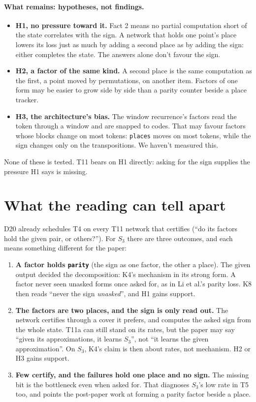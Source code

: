 \documentclass[11pt]{article}
\begin{document}
\paragraph{What remains: hypotheses, not findings.}
\begin{itemize}
\item \textbf{H1, no pressure toward it.} Fact 2 means no partial computation short of the state
  correlates with the sign. A network that holds one point's place lowers its loss just as much by
  adding a second place as by adding the sign: either completes the state. The answers alone don't
  favour the sign.
\item \textbf{H2, a factor of the same kind.} A second place is the same computation as the first,
  a point moved by permutations, on another item. Factors of one form may be easier to grow side by
  side than a parity counter beside a place tracker.
\item \textbf{H3, the architecture's bias.} The window recurrence's factors read the token through
  a window and are snapped to codes. That may favour factors whose blocks change on most tokens:
  \texttt{places} moves on most tokens, while the sign changes only on the transpositions. We
  haven't measured this.
\end{itemize}
None of these is tested. T11 bears on H1 directly: asking for the sign supplies the pressure H1
says is missing.

\section{What the reading can tell apart}

D20 already schedules T4 on every T11 network that certifies (``do its factors hold the given pair,
or others?''). For $S_3$ there are three outcomes, and each means something different for the paper:

\begin{enumerate}
\item \textbf{A factor holds \texttt{parity}} (the sign as one factor, the other a place). The given
  output decided the decomposition: K4's mechanism in its strong form. A factor never seen unasked
  forms once asked for, as in Li et al.'s parity loss. K8 then reads ``never the sign
  \emph{unasked}'', and H1 gains support.
\item \textbf{The factors are two places, and the sign is only read out.} The network certifies
  through a cover it prefers, and computes the asked sign from the whole state. T11a can still stand
  on its rates, but the paper may say ``given its approximations, it learns $S_3$'', not ``it learns
  the given approximation''. On $S_3$, K4's claim is then about rates, not mechanism. H2 or H3 gains
  support.
\item \textbf{Few certify, and the failures hold one place and no sign.} The missing bit is the
  bottleneck even when asked for. That diagnoses $S_3$'s low rate in T5 too, and points the
  post-paper work at forming a parity factor beside a place.
\end{enumerate}
\end{document}

